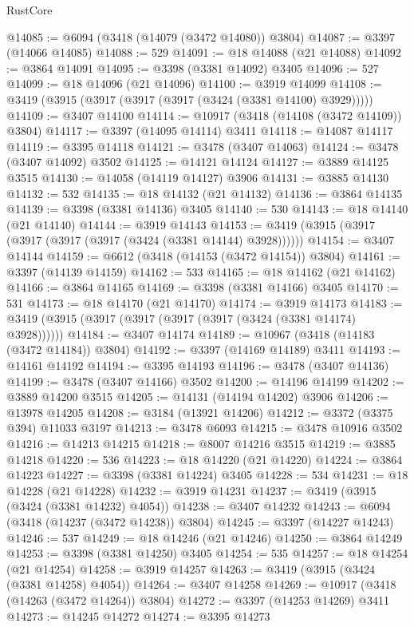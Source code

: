 \begin{lexlean}{RustCore}
\begin{coremodule}
@14085 := @6094 (@3418 (@14079 (@3472 @14080)) @3804)
@14087 := @3397 (@14066 @14085)
@14088 := 529
@14091 := @18 @14088 (@21 @14088)
@14092 := @3864 @14091
@14095 := @3398 (@3381 @14092) @3405
@14096 := 527
@14099 := @18 @14096 (@21 @14096)
@14100 := @3919 @14099
@14108 := @3419 (@3915 (@3917 (@3917 (@3917 (@3424 (@3381 @14100) @3929)))))
@14109 := @3407 @14100
@14114 := @10917 (@3418 (@14108 (@3472 @14109)) @3804)
@14117 := @3397 (@14095 @14114) @3411
@14118 := @14087 @14117
@14119 := @3395 @14118
@14121 := @3478 (@3407 @14063)
@14124 := @3478 (@3407 @14092) @3502
@14125 := @14121 @14124
@14127 := @3889 @14125 @3515
@14130 := @14058 (@14119 @14127) @3906
@14131 := @3885 @14130
@14132 := 532
@14135 := @18 @14132 (@21 @14132)
@14136 := @3864 @14135
@14139 := @3398 (@3381 @14136) @3405
@14140 := 530
@14143 := @18 @14140 (@21 @14140)
@14144 := @3919 @14143
@14153 := @3419 (@3915 (@3917 (@3917 (@3917 (@3917 (@3424 (@3381 @14144) @3928))))))
@14154 := @3407 @14144
@14159 := @6612 (@3418 (@14153 (@3472 @14154)) @3804)
@14161 := @3397 (@14139 @14159)
@14162 := 533
@14165 := @18 @14162 (@21 @14162)
@14166 := @3864 @14165
@14169 := @3398 (@3381 @14166) @3405
@14170 := 531
@14173 := @18 @14170 (@21 @14170)
@14174 := @3919 @14173
@14183 := @3419 (@3915 (@3917 (@3917 (@3917 (@3917 (@3424 (@3381 @14174) @3928))))))
@14184 := @3407 @14174
@14189 := @10967 (@3418 (@14183 (@3472 @14184)) @3804)
@14192 := @3397 (@14169 @14189) @3411
@14193 := @14161 @14192
@14194 := @3395 @14193
@14196 := @3478 (@3407 @14136)
@14199 := @3478 (@3407 @14166) @3502
@14200 := @14196 @14199
@14202 := @3889 @14200 @3515
@14205 := @14131 (@14194 @14202) @3906
@14206 := @13978 @14205
@14208 := @3184 (@13921 @14206)
@14212 := @3372 (@3375 @394) @11033 @3197
@14213 := @3478 @6093
@14215 := @3478 @10916 @3502
@14216 := @14213 @14215
@14218 := @8007 @14216 @3515
@14219 := @3885 @14218
@14220 := 536
@14223 := @18 @14220 (@21 @14220)
@14224 := @3864 @14223
@14227 := @3398 (@3381 @14224) @3405
@14228 := 534
@14231 := @18 @14228 (@21 @14228)
@14232 := @3919 @14231
@14237 := @3419 (@3915 (@3424 (@3381 @14232) @4054))
@14238 := @3407 @14232
@14243 := @6094 (@3418 (@14237 (@3472 @14238)) @3804)
@14245 := @3397 (@14227 @14243)
@14246 := 537
@14249 := @18 @14246 (@21 @14246)
@14250 := @3864 @14249
@14253 := @3398 (@3381 @14250) @3405
@14254 := 535
@14257 := @18 @14254 (@21 @14254)
@14258 := @3919 @14257
@14263 := @3419 (@3915 (@3424 (@3381 @14258) @4054))
@14264 := @3407 @14258
@14269 := @10917 (@3418 (@14263 (@3472 @14264)) @3804)
@14272 := @3397 (@14253 @14269) @3411
@14273 := @14245 @14272
@14274 := @3395 @14273

\end{coremodule}
\end{lexlean}
